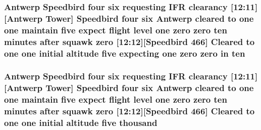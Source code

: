 \subsubsection[{\texorpdfstring{ten}{ten}}]{\setlength{\rightskip}{0pt plus 5cm}Antwerp Speedbird four {\bf six} requesting I\+FR clearancy \mbox{[}12\+:11\mbox{]}\mbox{[}Antwerp {\bf Tower}\mbox{]} Speedbird four {\bf six} Antwerp cleared to {\bf one} {\bf one} maintain five expect flight level {\bf one} {\bf zero} {\bf zero} ten minutes after squawk {\bf zero} \mbox{[}12\+:12\mbox{]}\mbox{[}Speedbird 466\mbox{]} Cleared to {\bf one} {\bf one} initial altitude five expecting {\bf one} {\bf zero} {\bf zero} in ten}\hypertarget{happyDay4ATC_8txt_ab9794f8235db42812d8ddd9368cb321e}{}\label{happyDay4ATC_8txt_ab9794f8235db42812d8ddd9368cb321e}
\subsubsection[{\texorpdfstring{thousand}{thousand}}]{\setlength{\rightskip}{0pt plus 5cm}Antwerp Speedbird four {\bf six} requesting I\+FR clearancy \mbox{[}12\+:11\mbox{]}\mbox{[}Antwerp {\bf Tower}\mbox{]} Speedbird four {\bf six} Antwerp cleared to {\bf one} {\bf one} maintain five expect flight level {\bf one} {\bf zero} {\bf zero} {\bf ten} minutes after squawk {\bf zero} \mbox{[}12\+:12\mbox{]}\mbox{[}Speedbird 466\mbox{]} Cleared to {\bf one} {\bf one} initial altitude five thousand}\hypertarget{happyDay4ATC_8txt_a429913a0643fe14faca3dca538caa7bb}{}\label{happyDay4ATC_8txt_a429913a0643fe14faca3dca538caa7bb}
